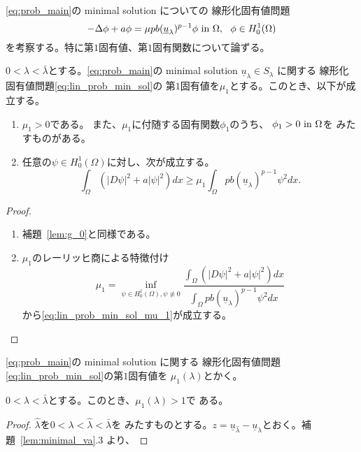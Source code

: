 \ref{eq:prob_main}の minimal solution についての
線形化固有値問題
\begin{equation}
 -\Delta \phi + a \phi = \mu p b (\underline{u}_\lambda)^{p-1} \phi
  ~\text{in}~ \Omega, \ \ \phi \in H_0^1(\Omega) \label{eq:lin_prob_min_sol}
\end{equation}
を考察する。特に第$1$固有値、第$1$固有関数について論ずる。

\begin{lem}
 $0 < \lambda < \bar{\lambda}$とする。\ref{eq:prob_main}の
 minimal solution $\underline{u}_\lambda \in S_\lambda$ に関する
 線形化固有値問題\eqref{eq:lin_prob_min_sol}の
 第$1$固有値を$\mu_1$とする。このとき、以下が成立する。
 \begin{enumerate}[1.]
  \item $\mu_1 > 0$である。
        また、$\mu_1$に付随する固有関数$\phi_1$のうち、
        $\phi_1 > 0 ~\text{in}~ \Omega$を
        みたすものがある。
  \item 任意の$\psi \in H_0^1(\Omega)$に対し、次が成立する。
        \begin{equation}
         \int_\Omega \left( \lvert D\psi \rvert^2 + a \lvert \psi
                      \rvert^2 \right)
          dx \geq \mu_1 \int_\Omega pb(\underline{u}_\lambda)^{p-1}
          \psi^2 dx. \label{eq:lin_prob_min_sol_mu_1}
        \end{equation}
 \end{enumerate}
\end{lem}

\begin{proof}
 \begin{enumerate}[1.]
  \item 補題~\ref{lem:g_0}と同様である。
  \item $\mu_1$のレーリッヒ商による特徴付け
        \[
         \mu_1 = \inf_{\psi \in H_0^1(\Omega), \psi \not \equiv 0} 
        \frac{\displaystyle \int_\Omega 
        \left( \left\lvert D\psi \right\rvert^2 + a\lvert\psi\rvert^2 \right)
          dx }{\displaystyle \int_\Omega pb(\underline{u}_\lambda)^{p-1}
          \psi^2 dx }
        \]
        から\eqref{eq:lin_prob_min_sol_mu_1}が成立する。
 \end{enumerate}
\end{proof}

\begin{nota}
 \ref{eq:prob_main}の
 minimal solution に関する
 線形化固有値問題\eqref{eq:lin_prob_min_sol}の第$1$固有値を
 $\mu_1(\lambda)$とかく。
\end{nota}

\begin{lem}
 $0 < \lambda < \bar{\lambda}$とする。このとき、$\mu_1(\lambda) > 1$で
 ある。
\end{lem}

\begin{proof}
 $\hat{\lambda}$を$0 < \lambda < \hat{\lambda} < \bar{\lambda}$を
 みたすものとする。$z = \underline{u}_{\hat{\lambda}} -
 \underline{u}_\lambda$とおく。補題~\ref{lem:minimal_va}.3 より、
\end{proof}